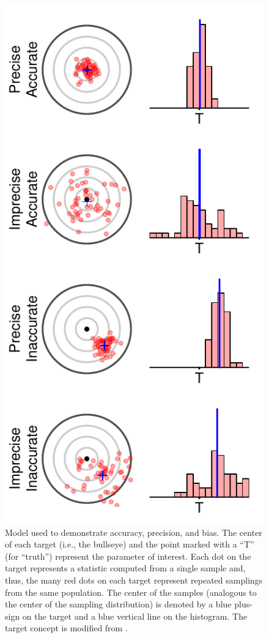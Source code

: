 \documentclass[10pt,openany]{book}\usepackage[]{graphicx}\usepackage[]{color}
\newenvironment{knitrout}{}{} %
\begin{document}
\begin{knitrout}
\color{fgcolor}\begin{figure}[hbtp]

{\centering \includegraphics[width=.4\linewidth]{Figs/AccPrec-1} 

}

\caption[Accuracy and precision model]{Model used to demonstrate accuracy, precision, and bias.  The center of each target (i.e., the bullseye) and the point marked with a ``T'' (for ``truth'') represent the parameter of interest.  Each dot on the target represents a statistic computed from a single sample and, thus, the many red dots on each target represent repeated samplings from the same population.  The center of the samples (analogous to the center of the sampling distribution) is denoted by a blue plus-sign on the target and a blue vertical line on the histogram.  The target concept is modified from \cite{RattiGarton94}.}\label{fig:AccPrec}
\end{figure}


\end{knitrout}


\vspace{-12pt}
\end{document}

